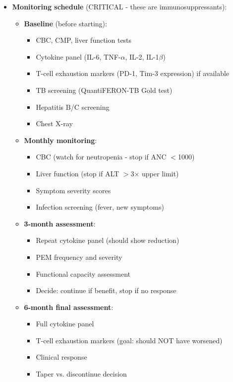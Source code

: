 \begin{itemize}
    \item \textbf{Monitoring schedule} (CRITICAL - these are immunosuppressants):
    \begin{itemize}
        \item \textbf{Baseline} (before starting):
        \begin{itemize}
            \item CBC, CMP, liver function tests
            \item Cytokine panel (IL-6, TNF-$\alpha$, IL-2, IL-1$\beta$)
            \item T-cell exhaustion markers (PD-1, Tim-3 expression) if available
            \item TB screening (QuantiFERON-TB Gold test)
            \item Hepatitis B/C screening
            \item Chest X-ray
        \end{itemize}

        \item \textbf{Monthly monitoring}:
        \begin{itemize}
            \item CBC (watch for neutropenia - stop if ANC $<$1000)
            \item Liver function (stop if ALT $>$3× upper limit)
            \item Symptom severity scores
            \item Infection screening (fever, new symptoms)
        \end{itemize}

        \item \textbf{3-month assessment}:
        \begin{itemize}
            \item Repeat cytokine panel (should show reduction)
            \item PEM frequency and severity
            \item Functional capacity assessment
            \item Decide: continue if benefit, stop if no response
        \end{itemize}

        \item \textbf{6-month final assessment}:
        \begin{itemize}
            \item Full cytokine panel
            \item T-cell exhaustion markers (goal: should NOT have worsened)
            \item Clinical response
            \item Taper vs. discontinue decision
        \end{itemize}
    \end{itemize}


\end{itemize}
